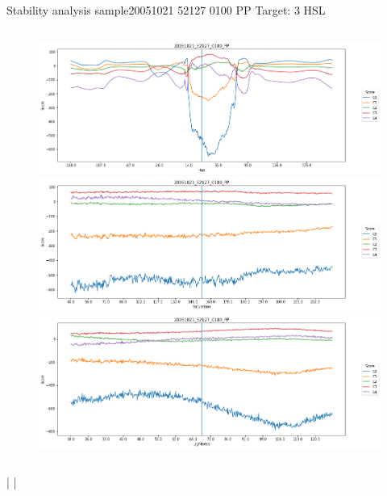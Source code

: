 \documentclass{beamer}
\begin{document}
\begin{frame}{Stability analysis sample}{20051021 52127 0100 PP Target: 3 HSL}
\begin{columns}
\begin{column}{0.45\textwidth}
\begin{figure}[p]
			\includegraphics[width=\textwidth]{chapter_stability/20051021_52127_0100_PP/h/scores.png}			\includegraphics[width=\textwidth]{chapter_stability/20051021_52127_0100_PP/s/scores.png}			\includegraphics[width=\textwidth]{chapter_stability/20051021_52127_0100_PP/l/scores.png}
		\end{figure}
	\end{column}
\end{columns}
\href{run:videos_stability/Messidor_20051021_52127_0100_PP_Target_3_Checking_Hue_Sensitivity.mp4}{\color{blue}{Hue}} | \href{run:videos_stability/Messidor_20051021_52127_0100_PP_Target_3_Checking_Saturation_Sensitivity.mp4}{\color{blue}{Saturation}} | \href{run:videos_stability/Messidor_20051021_52127_0100_PP_Target_3_Checking_Luminance_Sensitivity.mp4}{\color{blue}{Lightness}}
\end{frame}
\end{document}
